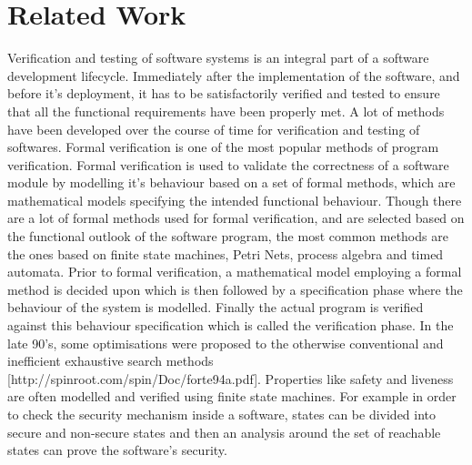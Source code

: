 

\section{Related Work}

Verification and testing of software systems is an integral part of a software development lifecycle. Immediately after the implementation of the software, and before it's deployment, it has to be satisfactorily verified and tested to ensure that all the functional requirements have been properly met. A lot of methods have been developed over the course of time for verification and testing of softwares. Formal verification is one of the most popular methods of program verification. Formal verification is used to validate the correctness of a software module by modelling it's behaviour based on a set of formal methods, which are mathematical models specifying the intended functional behaviour. Though there are a lot of formal methods used for formal verification, and are selected based on the functional outlook of the software program, the most common methods are the ones based on finite state machines, Petri Nets, process algebra and timed automata. Prior to formal verification, a mathematical model employing a formal method is decided upon which is then followed by a specification phase where the behaviour of the system is modelled. Finally the actual program is verified against this behaviour specification which is called the verification phase. In the late 90's, some optimisations were proposed to the otherwise conventional and inefficient exhaustive search methods [http://spinroot.com/spin/Doc/forte94a.pdf]. Properties like safety and liveness are often modelled and verified using finite state machines. For example in order to check the security mechanism inside a software, states can be divided into secure and non-secure states and then an analysis around the set of reachable states can prove the software's security.

